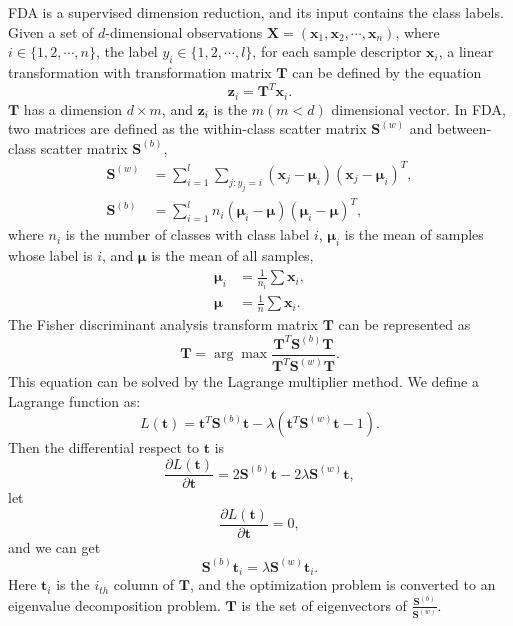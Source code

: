 FDA is a supervised dimension reduction, and its input contains the class labels. Given a set of $d$-dimensional observations $\bm{X} = (\bm{x}_1, \bm{x}_2,\cdots,\bm{x}_n)$, where $i\in\{1,2,\cdots,n\}$, the label $y_i\in\{1,2,\cdots,l\}$, for each sample descriptor $\bm{x}_i$, a linear transformation with transformation matrix $\bm{T}$ can be defined by the equation
\begin{equation}
\bm{z}_i = \bm{T}^T\bm{x}_i.
\end{equation}
$\bm{T}$ has a dimension $d\times m$, and $\bm{z}_i$ is the $m(m<d)$ dimensional vector. In FDA, two matrices are defined as the within-class scatter matrix $\bm{S}^{(w)}$ and between-class scatter matrix $\bm{S}^{(b)}$, 
\begin{equation}
\begin{aligned}
\bm{S}^{(w)} &= \mathop{\sum} _{i=1}^l\mathop{\sum}_{j:y_j = i} (\bm{x}_j - \bm{\mu}_i)(\bm{x}_j - \bm{\mu}_i)^T,\\
\bm{S}^{(b)}  &= \mathop{\sum} _{i=1}^l n_i(\bm{\mu}_i - \bm{\mu})(\bm{\mu}_i - \bm{\mu})^T,
\end{aligned}
\end{equation}
where $n_i$ is the number of classes with class label $i$, $\bm{\mu}_i$ is the mean of samples whose label is $i$, and $\bm{\mu}$ is the mean of all samples, 
\begin{equation}
\begin{aligned}
\bm{\mu}_i &= \frac{1}{n_i} \sum \bm{x}_i, \\
\bm{\mu} &= \frac{1}{n} \sum \bm{x}_i.
\end{aligned}
\end{equation}
The Fisher discriminant analysis transform matrix $\bm{T}$ can be represented as 
\begin{equation}
\bm{T} = \arg\max \frac{\bm{T}^T\bm{S}^{(b)}\bm{T}}{\bm{T}^T\bm{S}^{(w)}\bm{T}}.
\end{equation}
This equation can be solved by the Lagrange multiplier method. We define a Lagrange function as:
\begin{equation}
L(\bm{t}) = \bm{t}^T\bm{S}^{(b)}\bm{t} - \lambda(\bm{t}^T\bm{S}^{(w)}\bm{t} - 1).
\end{equation}
Then the differential respect to $\bm{t}$ is 
\begin{equation}
\frac{\partial L(\bm{t})}{\partial \bm{t}} = 2\bm{S}^{(b)}\bm{t} - 2\lambda \bm{S}^{(w)}\bm{t},
\end{equation}
let 
\begin{equation}
\frac{\partial L(\bm{t})}{\partial \bm{t}} = 0,
\end{equation}
and we can get 
\begin{equation}\label{eigen1}
\bm{S}^{(b)}\bm{t}_i  = \lambda \bm{S}^{(w)}\bm{t}_i.
\end{equation}
Here $\bm{t}_i$ is the $i_{th}$ column of $\bm{T}$, and the optimization problem is converted to an eigenvalue decomposition problem. $\bm{T}$ is the set of eigenvectors of $\frac{\bm{S}^{(b)}}{\bm{S}^{(w)}}$.


